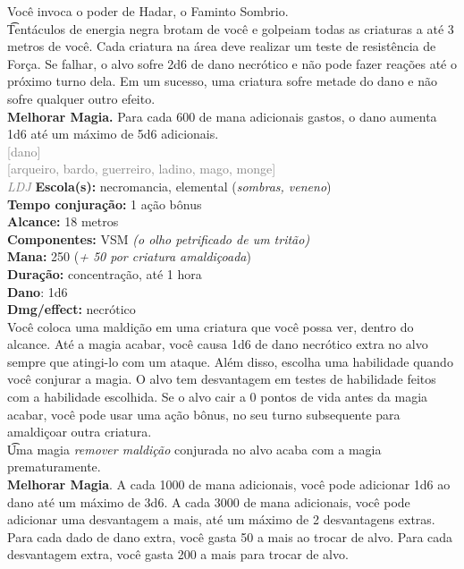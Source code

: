 \documentclass{RPG_Adventure}[2021/10/20]
\begin{document}
{\normalsize Você invoca o poder de Hadar, o Faminto Sombrio.\\\t Tentáculos de energia negra brotam de você e golpeiam todas as criaturas a até 3 metros de você. Cada criatura na área deve realizar um teste de resistência de Força. Se falhar, o alvo sofre 2d6 de dano necrótico e não pode fazer reações até o próximo turno dela. Em um sucesso, uma criatura sofre metade do dano e não sofre qualquer outro efeito.\\\t \textbf{Melhorar Magia.} Para cada 600 de mana adicionais gastos, o dano aumenta 1d6 até um máximo de 5d6 adicionais.\\}
{\scriptsize \textcolor{gray}{[dano]\\}}
{\scriptsize \textcolor{gray}{[arqueiro, bardo, guerreiro, ladino, mago, monge]\\}}
{\tiny \textcolor{gray}{\textit{LDJ}}}\jump{}
{\small \t \textbf{Escola(s):} necromancia, elemental (\textit{sombras, veneno})\\\t \textbf{Tempo conjuração:} 1 ação bônus\\\t \textbf{Alcance:} 18 metros\\\t \textbf{Componentes:} VSM \textit{(o olho petrificado de um tritão)}\\\t \textbf{Mana:} 250 (\textit{+ 50 por criatura amaldiçoada})\\\t \textbf{Duração:} concentração, até 1 hora\\\t \textbf{Dano}: 1d6\\\t \textbf{Dmg/effect:} necrótico\\}
{\normalsize Você coloca uma maldição em uma criatura que você possa ver, dentro do alcance. Até a magia acabar, você causa 1d6 de dano necrótico extra no alvo sempre que atingi-lo com um ataque. Além disso, escolha uma habilidade quando você conjurar a magia. O alvo tem desvantagem em testes de habilidade feitos com a habilidade escolhida.  Se o alvo cair a 0 pontos de vida antes da magia acabar, você pode usar uma ação bônus, no seu turno subsequente para amaldiçoar outra criatura.\\\t Uma magia \textit{remover maldição} conjurada no alvo acaba com a magia prematuramente.\\\t \textbf{Melhorar Magia}. A cada 1000 de mana adicionais, você pode adicionar 1d6 ao dano até um máximo de 3d6. A cada 3000 de mana adicionais, você pode adicionar uma desvantagem a mais, até um máximo de 2 desvantagens extras. Para cada dado de dano extra, você gasta 50 a mais ao trocar de alvo. Para cada desvantagem extra, você gasta 200 a mais para trocar de alvo.\\}
\end{document}
